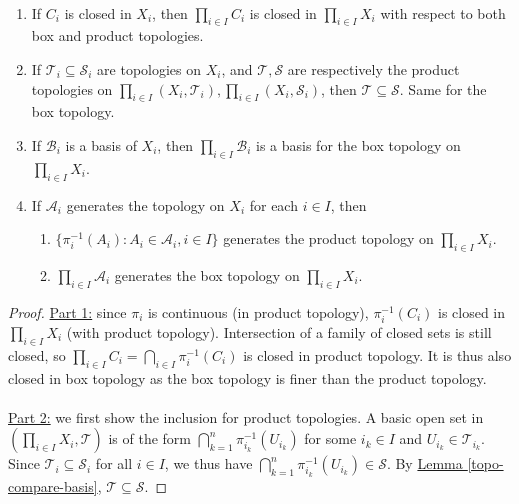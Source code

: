 \documentclass{treatise}
\begin{document}
\begin{shaded}
\begin{proposition} \ 
\begin{enumerate}
    \item If $C_i$ is closed in $X_i$, then $\prod_{i \in I} C_i$ is closed in $\prod_{i \in I} X_i$ with respect to both box and product topologies.
    \item If $\mathcal{T}_i \subseteq \mathcal{S}_i$ are topologies on $X_i$, and $\mathcal{T}, \mathcal{S}$ are respectively the product topologies on $\prod_{i \in I} (X_i, \mathcal{T}_i), \prod_{i \in I} (X_i, \mathcal{S}_i)$, then $\mathcal{T} \subseteq \mathcal{S}$. Same for the box topology.
    \item If $\mathcal{B}_i$ is a basis of $X_i$, then $\prod_{i \in I} \mathcal{B}_i$ is a basis for the box topology on $\prod_{i \in I} X_i$.
    \item If $\mathcal{A}_i$ generates the topology on $X_i$ for each $i \in I$, then
    \begin{enumerate}
        \item $\{ \pi_i^{-1} (A_i) : A_i \in \mathcal{A}_i, i \in I \}$ generates the product topology on $\prod_{i \in I} X_i$.
        \item $\prod_{i \in I} \mathcal{A}_i$ generates the box topology on $\prod_{i \in I} X_i$.
    \end{enumerate}
\end{enumerate}
\end{proposition}
\begin{proof}
\underline{Part 1:} since $\pi_i$ is continuous (in product topology), $\pi_i^{-1}(C_i)$ is closed in $\prod_{i \in I} X_i$ (with product topology). Intersection of a family of closed sets is still closed, so $\prod_{i \in I} C_i = \bigcap_{i \in I} \pi_i^{-1}(C_i)$ is closed in product topology. It is thus also closed in box topology as the box topology is finer than the product topology.
\\
\\
\underline{Part 2:} we first show the inclusion for product topologies. A basic open set in $(\prod_{i \in I} X_i, \mathcal{T})$ is of the form $\bigcap_{k = 1}^n \pi_{i_k}^{-1}(U_{i_k})$ for some $i_k \in I$ and $U_{i_k} \in \mathcal{T}_{i_k}$. Since $\mathcal{T}_i \subseteq \mathcal{S}_i$ for all $i \in I$, we thus have $\bigcap_{k = 1}^n \pi_{i_k}^{-1}(U_{i_k}) \in \mathcal{S}$. By \hyperref[topo-compare-basis]{Lemma \ref*{topo-compare-basis}}, $\mathcal{T} \subseteq \mathcal{S}$.

\end{proof}
\end{shaded}
\end{document}

